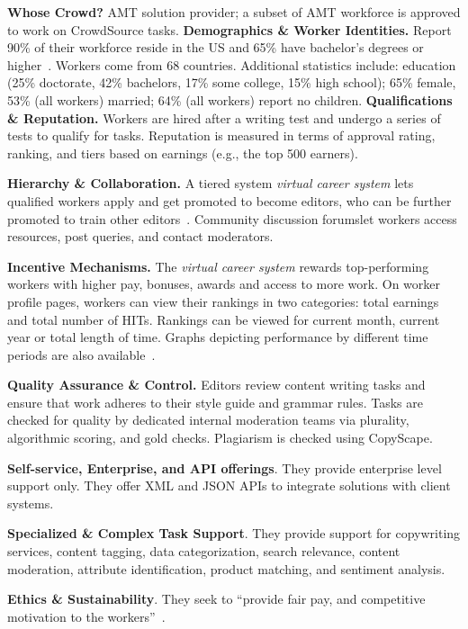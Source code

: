 \documentclass{sigchi}
\begin{document}
{\bf Whose Crowd?} AMT solution provider; a subset of AMT workforce is approved to work on CrowdSource tasks. 
{\bf Demographics \& Worker Identities.} Report 90\% of their workforce reside in the US and 65\% have bachelor's degrees or higher~\cite{cs-capabilities}. Workers come from 68 countries. 
Additional statistics include: education (25\% doctorate, 42\% bachelors, 17\% some college, 15\% high school); 65\% female, 53\% (all workers) married; 64\% (all workers) report no children.  
{\bf Qualifications \& Reputation.} Workers are hired after a writing test and  
undergo a series of tests to qualify for tasks. Reputation is measured in terms of approval rating, ranking, and tiers based on earnings (e.g., the top 500 earners). 


{\bf Hierarchy \& Collaboration.} A tiered system {\em virtual career system} lets qualified workers apply and get promoted to become editors, who can be further promoted to train other editors~\cite{CSScalableSol}. Community discussion forumslet workers access resources, post queries, and contact moderators.

{\bf Incentive Mechanisms.} The {\em virtual career system} rewards top-performing workers with higher pay, bonuses, awards and access to more work. On worker profile pages, workers can view their rankings in two categories: total earnings and total number of HITs. Rankings can be viewed for current month, current year or total length of time. Graphs depicting performance by different time periods are also available~\cite{CSWorkerProfiles}.


{\bf Quality Assurance \& Control.} Editors review content writing tasks and ensure that work adheres to their style guide and grammar rules. Tasks are checked for quality by dedicated internal moderation teams via plurality, algorithmic scoring, and gold checks. Plagiarism is checked using CopyScape. 

{\bf Self-service, Enterprise, and API offerings}. They provide enterprise level support only. They offer XML and JSON APIs to integrate solutions with client systems.

{\bf Specialized \& Complex Task Support}. They provide support for copywriting services, content tagging, data categorization, search relevance, content moderation, attribute identification, product matching, and sentiment analysis. 

{\bf Ethics \& Sustainability}. They seek to ``provide fair pay, and competitive motivation to the workers''~\cite{CSadditionWP}. 
\end{document}
